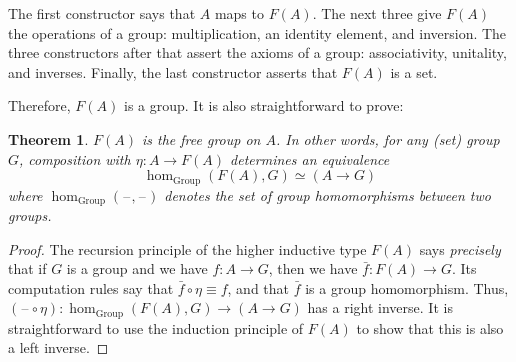 \documentclass[10pt,a4paper]{article}
\providecommand{\index}[1]{}
\newcommand{\jdeq}{\equiv}      %
\newcommand{\eqvsym}{\simeq}    %
\newcommand{\freegroup}[1]{F(#1)}
\newcommand{\blank}{\mathord{\hspace{1pt}\text{--}\hspace{1pt}}}
\newtheorem{thm}{Theorem}[section]
\theoremstyle{definition}
\theoremstyle{remark}
\numberwithin{equation}{section}
\newcommand{\indexdef}[1]{\index{#1|defstyle}}   %
\begin{document}
The first constructor says that $A$ maps to $\freegroup{A}$.
The next three give $\freegroup{A}$ the operations of a group: multiplication, an identity element, and inversion.
The three constructors after that assert the axioms of a group: associativity\index{associativity}, unitality, and inverses.
Finally, the last constructor asserts that $\freegroup{A}$ is a set.

Therefore, $\freegroup{A}$ is a group.
It is also straightforward to prove:

\begin{thm}
  \index{universal!property!of free group}%
  $\freegroup{A}$ is the free group on $A$.
  In other words, for any (set) group $G$, composition with $\eta:A\to \freegroup{A}$ determines an equivalence
  \[ \hom_{\mathrm{Group}}(\freegroup{A},G) \eqvsym (A\to G) \]
  where $\hom_{\mathrm{Group}}(\blank,\blank)$ denotes the set of group homomorphisms between two groups.
  \indexdef{group!homomorphism}%
  \indexdef{homomorphism!group}%
\end{thm}

\begin{proof}
  The recursion principle of the higher inductive type $\freegroup{A}$ says \emph{precisely} that if $G$ is a group and we have $f:A\to G$, then we have $\bar{f}:\freegroup{A} \to G$.
  Its computation rules say that $\bar{f}\circ \eta \jdeq f$, and that $\bar f$ is a group homomorphism.
  Thus, $(\blank\circ \eta) :  \hom_{\mathrm{Group}}(\freegroup{A},G) \to (A\to G)$ has a right inverse.
  It is straightforward to use the induction principle of $\freegroup{A}$ to show that this is also a left inverse.
\end{proof}
\end{document}
